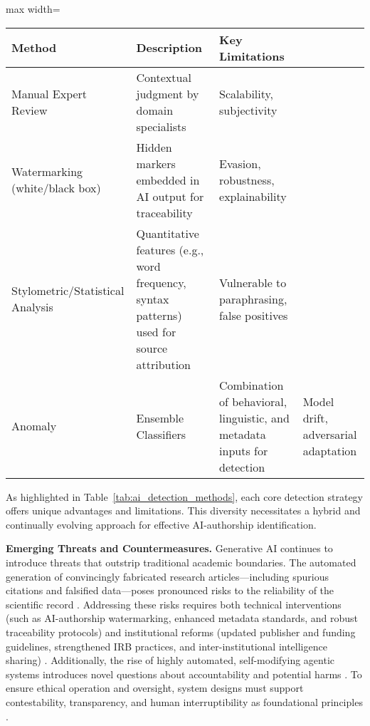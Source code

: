 \begin{table*}[htbp]
\centering
\caption{Core Detection Approaches for AI-Generated Academic Content}
\label{tab:ai_detection_methods}
\begin{adjustbox}{max width=\textwidth}
\begin{tabular}{@{}llll@{}}
\toprule
\textbf{Method} & \textbf{Description} & \textbf{Key Limitations} &  \\
\midrule
Manual Expert Review & Contextual judgment by domain specialists & Scalability, subjectivity &  \\
Watermarking (white/black box) & Hidden markers embedded in AI output for traceability & Evasion, robustness, explainability &  \\
Stylometric/Statistical Analysis & Quantitative features (e.g., word frequency, syntax patterns) used for source attribution & Vulnerable to paraphrasing, false positives &  \\
Anomaly & Ensemble Classifiers & Combination of behavioral, linguistic, and metadata inputs for detection & Model drift, adversarial adaptation \\
\bottomrule
\end{tabular}
\end{adjustbox}
\end{table*}

As highlighted in Table~\ref{tab:ai_detection_methods}, each core detection strategy offers unique advantages and limitations. This diversity necessitates a hybrid and continually evolving approach for effective AI-authorship identification.

\textbf{Emerging Threats and Countermeasures.}
Generative AI continues to introduce threats that outstrip traditional academic boundaries. The automated generation of convincingly fabricated research articles—including spurious citations and falsified data—poses pronounced risks to the reliability of the scientific record \cite{ref2,ref39,ref92,ref93,ref95,ref97,ref98}. Addressing these risks requires both technical interventions (such as AI-authorship watermarking, enhanced metadata standards, and robust traceability protocols) \cite{ref53,ref86,ref91,ref97,ref98,ref100} and institutional reforms (updated publisher and funding guidelines, strengthened IRB practices, and inter-institutional intelligence sharing) \cite{ref4,ref9,ref41,ref66,ref84,ref95,ref110}. Additionally, the rise of highly automated, self-modifying agentic systems introduces novel questions about accountability and potential harms \cite{ref9,ref37,ref38,ref39,ref61,ref66,ref95,ref106}. To ensure ethical operation and oversight, system designs must support contestability, transparency, and human interruptibility as foundational principles \cite{ref61,ref64,ref95,ref110}.

